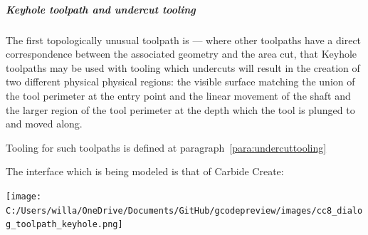 \documentclass{ltxdoc}
\begin{document}
%
%
%
%
%

\subparagraph{Keyhole toolpath and undercut tooling}
 
\label{subsec:keyholetoolpaths}
The first topologically unusual toolpath is  --- where other toolpaths have a direct correspondence between the associated geometry and the area cut, that Keyhole toolpaths may be used with tooling which undercuts will result in the creation of two different physical physical regions: the visible surface matching the union of the tool perimeter at the entry point and the linear movement of the shaft and the larger region of the tool perimeter at the depth which the tool is plunged to and moved along.
 
Tooling for such toolpaths is defined at paragraph~\ref{para:undercuttooling}

The interface which is being modeled is that of Carbide Create:

\bigskip

\begin{centering}
\texttt{[image: C:/Users/willa/OneDrive/Documents/GitHub/gcodepreview/images/cc8\_dialog\_toolpath\_keyhole.png]}\par
\end{centering}
\end{document}
